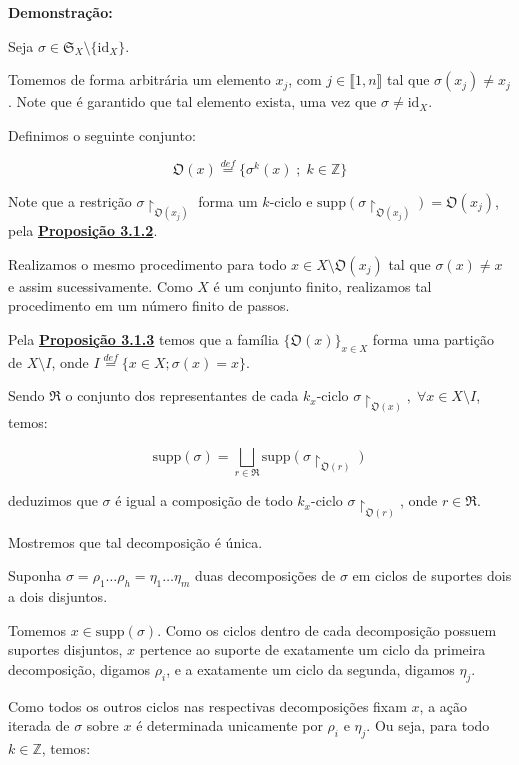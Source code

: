 \documentclass[16pt,openany]{book}
\theoremstyle{definition}
\begin{document}
\textbf{Demonstração:}

Seja $\sigma\in\mathfrak{S}_X\setminus\{\text{id}_X\}$.

Tomemos de forma arbitrária um elemento $x_j$, com $j\in\llbracket 1,n\rrbracket$ tal que $\sigma(x_j)\neq x_j$. Note que é garantido que tal elemento exista, uma vez que $\sigma \neq \text{id}_X$.

Definimos o seguinte conjunto:

\[
\mathfrak{O}(x) \overset{def}{=} \{\sigma^k(x)\; ; \;k\in\mathbb{Z} \}
\]

Note que a restrição $\sigma\upharpoonright_{\mathfrak{O}(x_j)}$ forma um $k$-ciclo e $\text{supp}(\sigma\upharpoonright_{\mathfrak{O}(x_j)}) = \mathfrak{O}(x_j)$, pela \hyperlink{prop212}{\textbf{Proposição 3.1.2}}.

Realizamos o mesmo procedimento para todo $x\in X\setminus \mathfrak{O}(x_j)$ tal que $\sigma(x)\neq x$ e assim sucessivamente. Como $X$ é um conjunto finito, realizamos tal procedimento em um número finito de passos.

Pela \hyperlink{prop213}{\textbf{Proposição 3.1.3}} temos que a família $\{\mathfrak{O}(x)\}_{x\in X}$ forma uma partição de $X\setminus I$, onde $I\overset{def}{=} \{ x\in X ; \sigma(x) = x \}$.

Sendo $\mathfrak{R}$ o conjunto dos representantes de cada $k_x$-ciclo $\sigma \upharpoonright_{\mathfrak{O}(x)}, \; \forall x\in X\setminus I$, temos:

\[
\text{supp}(\sigma) = \bigsqcup_{r\in \mathfrak{R}} \text{supp}(\sigma\upharpoonright_{\mathfrak{O}(r)})
\]

deduzimos que $\sigma$ é igual a composição de todo $k_x$-ciclo $\sigma\upharpoonright_{\mathfrak{O}(r)}$, onde $r\in \mathfrak{R}$.

Mostremos que tal decomposição é única. 

Suponha $\sigma = \rho_1\ldots \rho_h = \eta_1\ldots\eta_m$ duas decomposições de $\sigma$ em ciclos de suportes dois a dois disjuntos.

Tomemos $x\in \text{supp}(\sigma)$. Como os ciclos dentro de cada decomposição possuem suportes disjuntos, $x$ pertence ao suporte de exatamente um ciclo da primeira decomposição, digamos $\rho_i$, e a exatamente um ciclo da segunda, digamos $\eta_j$.

Como todos os outros ciclos nas respectivas decomposições fixam $x$, a ação iterada de $\sigma$ sobre $x$ é determinada unicamente por $\rho_i$ e $\eta_j$. Ou seja, para todo $k \in \mathbb{Z}$, temos:
\end{document}
